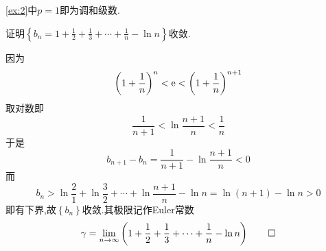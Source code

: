 \begin{red}
    \begin{remark}
        \cref{ex:2}中$p=1$即为调和级数.
    \end{remark}
\end{red}
\begin{brown}
    \begin{example}
        证明$\displaystyle\left\{b_n=1+\frac{1}{2}+\frac{1}{3}+\cdots+\frac{1}{n}-\ln n\right\}$收敛.
    \end{example}
    \begin{Proof}
        因为\[
        \left(
            1+\frac{1}{n}
        \right)^n<\mathrm{e}<\left(
            1+\frac{1}{n}
        \right)^{n+1}
        \]取对数即\[
        \frac{1}{n+1}<\ln\frac{n+1}{n}<\frac{1}{n}
        \]于是\[
        b_{n+1}-b_n=\frac{1}{n+1}-\ln\frac{n+1}{n}<0
        \]而\[
        b_n>\ln\frac{2}{1}+\ln\frac{3}{2}+\cdots+\ln\frac{n+1}{n}-\ln n=\ln\left(n+1\right)-\ln n>0
        \]即有下界,故$\left\{b_n\right\}$收敛.其极限记作Euler常数\[
        \gamma=\lim_{n\to\infty}\left(
            1+\frac{1}{2}+\frac{1}{3}+\cdots+\frac{1}{n}-\ln n
        \right)\qedhere
        \]
    \end{Proof}
\end{brown}
